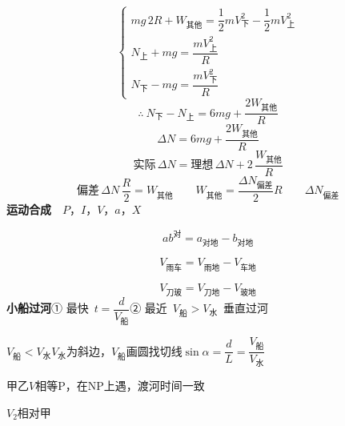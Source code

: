 \[
\begin{cases}
mg\,2R+W_{\text{其他}}=\dfrac{1}{2}mV_{\text{下}}^{2}-\dfrac{1}{2}mV_{\text{上}}^{2}\\[4pt]
N_{\text{上}}+mg=\dfrac{mV_{\text{上}}^{2}}{R}\\[4pt]
N_{\text{下}}-mg=\dfrac{mV_{\text{下}}^{2}}{R}
\end{cases}
\]
\[ \therefore\ N_{\text{下}}-N_{\text{上}}=6mg+\frac{2W_{\text{其他}}}{R} \]
\[ \Delta N=6mg+\frac{2W_{\text{其他}}}{R} \]
\[ \text{实际}\,\Delta N=\text{理想}\,\Delta N+2\,\frac{W_{\text{其他}}}{R} \]
\[ \text{偏差}\,\Delta N\,\frac{R}{2}=W_{\text{其他}}\qquad W_{\text{其他}}=\frac{\Delta N_{\text{偏差}}}{2}R\qquad \Delta N_{\text{偏差}} \]
\textbf{运动合成}\ \ {\footnotesize $P$，$I$，$V$，$a$，$X$}

\[ ab^{\text{对}}=a_{\text{对地}}-b_{\text{对地}} \]


\[ V_{\text{雨车}}=V_{\text{雨地}}-V_{\text{车地}} \]


\[ V_{\text{刀玻}}=V_{\text{刀地}}-V_{\text{玻地}} \]
\textbf{小船过河}\quad ① 最快\ $t=\dfrac{d}{V_{\text{船}}}$\quad ② 最近\ $V_{\text{船}}>V_{\text{水}}$\ 垂直过河

$V_{\text{船}}<V_{\text{水}}$\quad $V_{\text{水}}$为斜边，$V_{\text{船}}$画圆找切线\quad $\sin\alpha=\dfrac{d}{L}=\dfrac{V_{\text{船}}}{V_{\text{水}}}$



甲乙$V$相等P，在NP上遇，渡河时间一致


$V_2$相对甲



